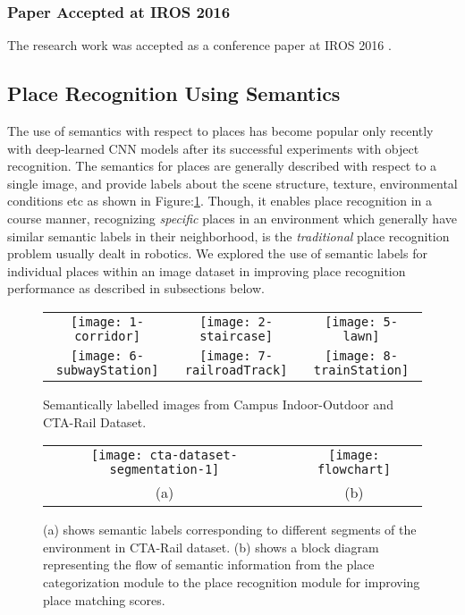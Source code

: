 \documentclass{article}
\begin{document}
\subsubsection{Paper Accepted at IROS 2016}
The research work was accepted as a conference paper at IROS 2016 \cite{skinner2016high}.

\subsection{Place Recognition Using Semantics}
The use of semantics with respect to places has become popular only recently with deep-learned CNN models after its successful experiments with object recognition. The semantics for places are generally described with respect to a single image, and provide labels about the scene structure, texture, environmental conditions etc as shown in Figure:\ref{fig:semLabels}. Though, it enables place recognition in a course manner, recognizing \emph{specific} places in an environment which generally have similar semantic labels in their neighborhood, is the \emph{traditional} place recognition problem usually dealt in robotics. We explored the use of semantic labels for individual places within an image dataset in improving place recognition performance as described in subsections below.

\begin{figure}
 \centering
 \begin{tabular}{ccc}
  \texttt{[image: 1-corridor]}&
  \texttt{[image: 2-staircase]}&
  \texttt{[image: 5-lawn]}\\
  \texttt{[image: 6-subwayStation]}&
  \texttt{[image: 7-railroadTrack]}&
  \texttt{[image: 8-trainStation]}\\
 \end{tabular}
\caption{Semantically labelled images from Campus Indoor-Outdoor and CTA-Rail Dataset.}
\label{fig:semLabels}
\end{figure}


\begin{figure}[htbp]
\centering
\begin{tabular}{cc}
	\hspace{-1cm}
	\texttt{[image: cta-dataset-segmentation-1]}&
	
	\texttt{[image: flowchart]}\\
	(a) & (b) \\
\end{tabular}
	\caption{ (a) shows semantic labels corresponding to different segments of the environment in CTA-Rail dataset. (b) shows a block diagram representing the flow of semantic information from the place categorization module to the place recognition module for improving place matching scores.}
	\label{fig:flowchart}
\end{figure}
\end{document}
